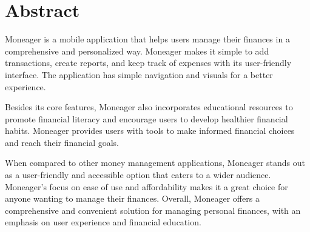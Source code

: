 \section*{Abstract} 

\hspace{\parindent}\hspace{\parindent} Moneager is a mobile application that helps users manage their finances in a comprehensive and personalized way. Moneager makes it simple to add transactions, create reports, and keep track of expenses with its user-friendly interface. The application has simple navigation and visuals for a better experience. 

\hspace{\parindent}Besides its core features, Moneager also incorporates educational resources to promote financial literacy and encourage users to develop healthier financial habits. Moneager provides users with tools to make informed financial choices and reach their financial goals.

\hspace{\parindent}When compared to other money management applications, Moneager stands out as a user-friendly and accessible option that caters to a wider audience. Moneager's focus on ease of use and affordability makes it a great choice for anyone wanting to manage their finances. Overall, Moneager offers a comprehensive and convenient solution for managing personal finances, with an emphasis on user experience and financial education.